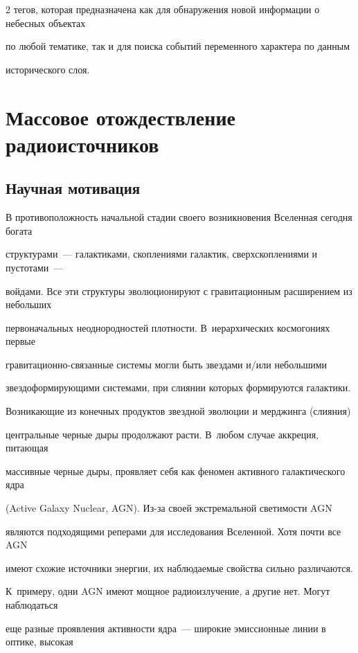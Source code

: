 \begin{multicols}{2}
тегов, которая предназначена как для обнаружения новой информации о небесных объектах 

по любой тематике, так и для поиска событий переменного характера по данным 

исторического слоя. 



\section{Массовое отождествление радиоисточников}



\subsection{Научная мотивация}



  В противоположность начальной стадии своего возникновения Вселенная сегодня богата 

структурами~--- галактиками, скоплениями галактик, сверхскоплениями и пустотами~--- 

войдами. Все эти структуры эволюционируют с гравитационным расширением из небольших 

первоначальных неоднородностей плотности. В~иерархических космогониях первые 

  гра\-ви\-та\-ци\-он\-но-свя\-зан\-ные сис\-те\-мы могли быть звездами и/или небольшими 

звездоформирующими системами, при слиянии которых формируются галактики. 

Возникающие из конечных продуктов звездной эволюции и мерджинга (слияния) 

центральные черные дыры продолжают расти. В~любом случае аккреция, питающая 

массивные черные дыры, проявляет себя как феномен активного галактического ядра 

({Active Galaxy Nuclear}, AGN). Из-за своей экстремальной светимости AGN 

являются подходящими реперами для исследования Вселенной. Хотя почти все AGN 

име\-ют схожие источники энергии, их наблю\-да\-емые свойства сильно различаются. 

К~примеру, одни AGN имеют мощное радиоизлучение, а другие нет. Могут наблюдаться 

еще разные проявления активности ядра~--- широкие эмиссионные линии в оптике, высокая 


\end{multicols}
